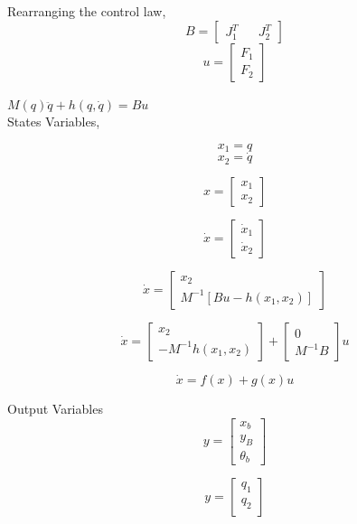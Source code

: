 \documentclass[14pt,a4paper,final]{article}
\begin{document}
Rearranging the control law, 
\[B = \begin{bmatrix}
J_1^T && J_2^T
\end{bmatrix}
\]
\[u = \begin{bmatrix}
F_1 \\
F_2
\end{bmatrix}
\] \\


$ M(q)\ddot{q}+h(q,\dot{q}) = Bu $ \\

States Variables,

\begin{equation}
x_1 = q 
\end{equation}
\begin{equation}
x_2 = \dot{q}
\end{equation}

\[x = \begin{bmatrix}
x_1 \\
x_2
\end{bmatrix}
\] 

\[\dot{x} = \begin{bmatrix}
\dot{x}_1 \\
\dot{x}_2
\end{bmatrix}
\] 

\[\dot{x} = \begin{bmatrix}
x_2 \\
M^{-1}[Bu-h(x_1,x_2)]
\end{bmatrix}
\] 

\[ \dot{x} =
\begin{bmatrix}
x_2 \\
-M^{-1}h(x_1,x_2)
\end{bmatrix} + \begin{bmatrix}
0 \\
M^{-1}B
\end{bmatrix} u
\]

\[\dot{x} = f(x) + g(x)u
\] 


Output Variables \\

\[y = \begin{bmatrix}
x_b \\
y_B \\
\theta_b
\end{bmatrix}
\] 

\[y = \begin{bmatrix}
q_1 \\
q_2 \\
\end{bmatrix}
\]
\end{document}
